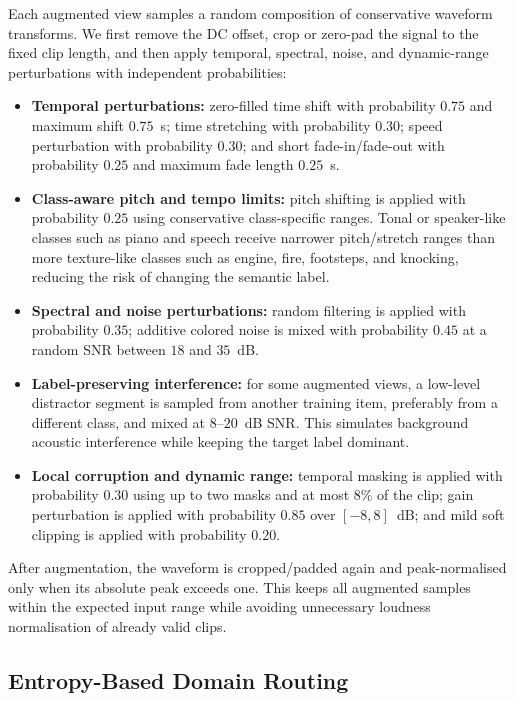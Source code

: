 \documentclass{article}
\begin{document}
\begin{sloppy}
Each augmented view samples a random composition of conservative waveform
transforms.  We first remove the DC offset, crop or zero-pad the signal to the
fixed clip length, and then apply temporal, spectral, noise, and dynamic-range
perturbations with independent probabilities:
\begin{itemize}
  \item \textbf{Temporal perturbations:} zero-filled time shift with probability
  $0.75$ and maximum shift $0.75$~s; time stretching with probability $0.30$;
  speed perturbation with probability $0.30$; and short fade-in/fade-out with
  probability $0.25$ and maximum fade length $0.25$~s.
  \item \textbf{Class-aware pitch and tempo limits:} pitch shifting is applied
  with probability $0.25$ using conservative class-specific ranges.  Tonal or
  speaker-like classes such as piano and speech receive narrower pitch/stretch
  ranges than more texture-like classes such as engine, fire, footsteps, and
  knocking, reducing the risk of changing the semantic label.
  \item \textbf{Spectral and noise perturbations:} random filtering is applied
  with probability $0.35$; additive colored noise is mixed with probability
  $0.45$ at a random SNR between $18$ and $35$~dB.
  \item \textbf{Label-preserving interference:} for some augmented views, a
  low-level distractor segment is sampled from another training item, preferably
  from a different class, and mixed at $8$--$20$~dB SNR.  This simulates
  background acoustic interference while keeping the target label dominant.
  \item \textbf{Local corruption and dynamic range:} temporal masking is
  applied with probability $0.30$ using up to two masks and at most $8\%$ of the
  clip; gain perturbation is applied with probability $0.85$ over $[-8,8]$~dB;
  and mild soft clipping is applied with probability $0.20$.
\end{itemize}
After augmentation, the waveform is cropped/padded again and peak-normalised
only when its absolute peak exceeds one.  This keeps all augmented samples
within the expected input range while avoiding unnecessary loudness
normalisation of already valid clips.


\subsection{Entropy-Based Domain Routing}
\label{ssec:entropy_routing}


\end{sloppy}
\end{document}

